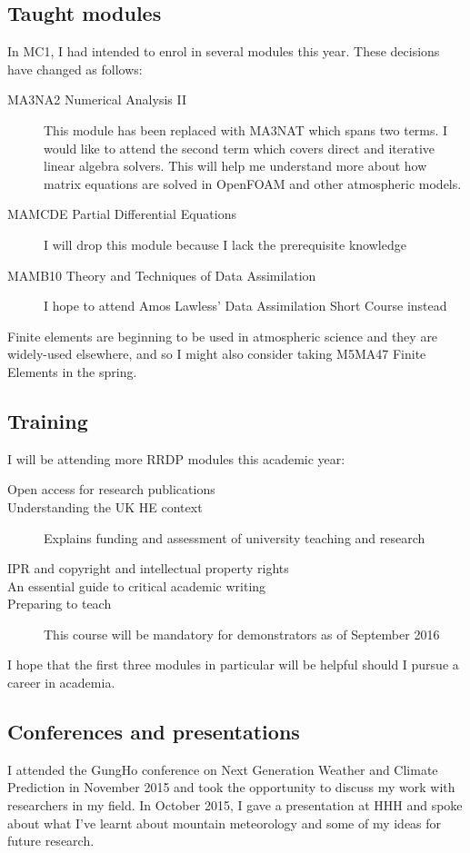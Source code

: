 \documentclass[a4paper]{article}
\begin{document}
\subsection{Taught modules}
In MC1, I had intended to enrol in several modules this year.  These decisions have changed as follows:
\begin{description}
\item[MA3NA2 Numerical Analysis II]{This module has been replaced with MA3NAT which spans two terms.  I would like to attend the second term which covers direct and iterative linear algebra solvers.  This will help me understand more about how matrix equations are solved in OpenFOAM and other atmospheric models.}
\item[MAMCDE Partial Differential Equations]{I will drop this module because I lack the prerequisite knowledge}
\item[MAMB10 Theory and Techniques of Data Assimilation]{I hope to attend Amos Lawless' Data Assimilation Short Course instead}
\end{description}
Finite elements are beginning to be used in atmospheric science and they are widely-used elsewhere, and so I might also consider taking M5MA47 Finite Elements in the spring.

\subsection{Training}
I will be attending more RRDP modules this academic year:
\begin{description}
	\item[Open access for research publications]{}
	\item[Understanding the UK HE context]{Explains funding and assessment of university teaching and research}
	\item[IPR and copyright and intellectual property rights]{}
	\item[An essential guide to critical academic writing]{}
	\item[Preparing to teach]{This course will be mandatory for demonstrators as of September 2016}
\end{description}
I hope that the first three modules in particular will be helpful should I pursue a career in academia.

\subsection{Conferences and presentations}
I attended the GungHo conference on Next Generation Weather and Climate Prediction in November 2015 and took the opportunity to discuss my work with researchers in my field.  In October 2015, I gave a presentation at HHH and spoke about what I've learnt about mountain meteorology and some of my ideas for future research.
\end{document}
